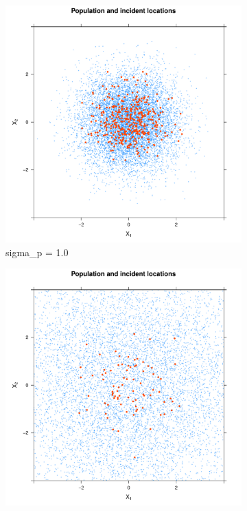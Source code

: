 \begin{figure}[htbp]
    \centering
    \begin{subfigure}{0.45\textwidth}
        \includegraphics[width=\textwidth]{results/p1.0_100_1.0_1h/output/population_and_incidents_scatter}
        \caption{\gls{sigma_p} = 1.0}
        \label{fig:one_sample:pSD_100_1h:1.0}
    \end{subfigure}
    \begin{subfigure}{0.45\textwidth}
        \includegraphics[width=\textwidth]{results/p2.8_100_1.0_1h/output/population_and_incidents_scatter}

\end{subfigure}
\end{figure}

